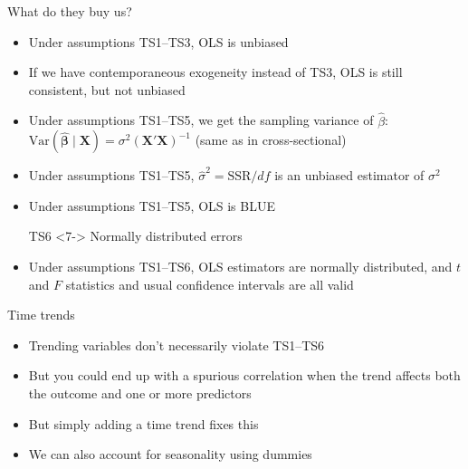 \documentclass[
  ignorenonframetext,
]{beamer}
\providecommand{\tightlist}{%
  \setlength{\itemsep}{0pt}\setlength{\parskip}{0pt}}
\newcommand{\setsep}{\setlength{\itemsep}{3pt}}
\newcommand{\setskip}{\setlength{\parskip}{3pt}}
\renewcommand{\tightlist}{\setsep\setskip}
\begin{document}
\begin{frame}{What do they buy us?}
\label{what-do-they-buy-us}
\pause

\begin{itemize}[<+->]
\tightlist
\item
  Under assumptions TS1--TS3, OLS is unbiased
\item
  If we have contemporaneous exogeneity instead of TS3, OLS is still consistent, but not unbiased
\item
  Under assumptions TS1--TS5, we get the sampling variance of \(\hat{\beta}\): \(\text{Var}\left(\hat{\boldsymbol\beta}\mid\mathbf{X}\right) = \sigma^2\left(\mathbf{X'X}\right)^{-1}\) (same as in cross-sectional)
\item
  Under assumptions TS1--TS5, \(\hat{\sigma}^2 = \text{SSR}/df\) is an unbiased estimator of \(\sigma^2\)
\item
  Under assumptions TS1--TS5, OLS is BLUE
\end{itemize}

\begin{itemize}
    \setlength{\itemsep}{3pt}\setlength{\parskip}{3pt}
    \item[TS6]<7-> Normally distributed errors
\end{itemize}

\begin{itemize}
    \setlength{\itemsep}{3pt}\setlength{\parskip}{3pt}
    \item<8-> Under assumptions TS1--TS6, OLS estimators are normally distributed, and $t$ and $F$ statistics and usual confidence intervals are all valid
\end{itemize}
\end{frame}

\begin{frame}{Time trends}
\label{time-trends}
\pause

\begin{itemize}[<+->]
\tightlist
\item
  Trending variables don't necessarily violate TS1--TS6
\item
  But you could end up with a spurious correlation when the trend affects both the outcome and one or more predictors
\item
  But simply adding a time trend fixes this
\item
  We can also account for seasonality using dummies
\end{itemize}
\end{frame}
\end{document}

